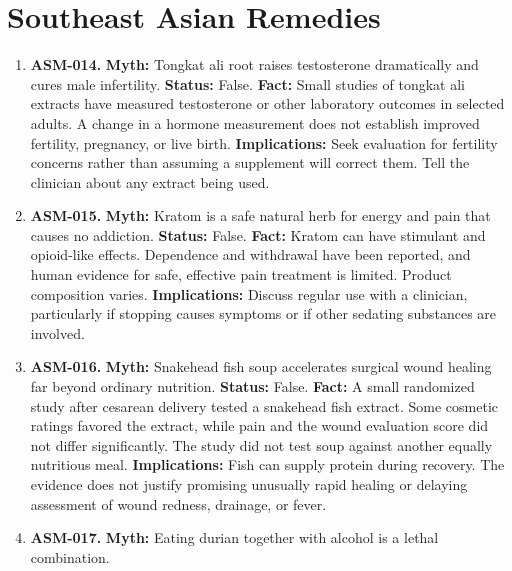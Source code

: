 \documentclass[11pt,oneside]{book}
\begin{document}
\section{Southeast Asian Remedies}
\begin{enumerate}[leftmargin=0pt,labelwidth=0pt,labelsep=0pt,itemindent=0pt]
\item[] \textbf{ASM-014.} \textbf{Myth:} Tongkat ali root raises testosterone dramatically and cures male infertility.\newline
\textbf{Status:} False.\newline
\textbf{Fact:} Small studies of tongkat ali extracts have measured testosterone or other laboratory outcomes in selected adults. A change in a hormone measurement does not establish improved fertility, pregnancy, or live birth. \cite{ref150,ref484}\newline
\textbf{Implications:} Seek evaluation for fertility concerns rather than assuming a supplement will correct them. Tell the clinician about any extract being used.
\item[] \textbf{ASM-015.} \textbf{Myth:} Kratom is a safe natural herb for energy and pain that causes no addiction.\newline
\textbf{Status:} False.\newline
\textbf{Fact:} Kratom can have stimulant and opioid-like effects. Dependence and withdrawal have been reported, and human evidence for safe, effective pain treatment is limited. Product composition varies. \cite{ref485}\newline
\textbf{Implications:} Discuss regular use with a clinician, particularly if stopping causes symptoms or if other sedating substances are involved.
\item[] \textbf{ASM-016.} \textbf{Myth:} Snakehead fish soup accelerates surgical wound healing far beyond ordinary nutrition.\newline
\textbf{Status:} False.\newline
\textbf{Fact:} A small randomized study after cesarean delivery tested a snakehead fish extract. Some cosmetic ratings favored the extract, while pain and the wound evaluation score did not differ significantly. The study did not test soup against another equally nutritious meal. \cite{ref486}\newline
\textbf{Implications:} Fish can supply protein during recovery. The evidence does not justify promising unusually rapid healing or delaying assessment of wound redness, drainage, or fever.
\item[] \textbf{ASM-017.} \textbf{Myth:} Eating durian together with alcohol is a lethal combination.\newline

\end{enumerate}
\end{document}
